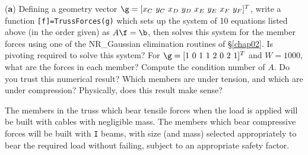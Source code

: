 \begin{exercise}
\noindent ({\bf a}) Defining a geometry vector
$\g=[x_C\ y_C\ x_D\ y_D\ x_E\ y_E\ x_F\ y_F]^T$,
write a function {\tt [f]=TrussForces(g)} which
sets up the system of 10 equations listed above (in the order given)
as $A\f = \b$, then solves this system for the member
forces using one of the NR_Gaussian elimination routines of \S \ref{chap02}.  Is pivoting required to solve this system?
For $\g=[1\ 0\ 1\ 1\ 2\ 0\ 2\ 1]^T$ and
$W=1000$, what are the forces in each member?  Compute the
condition number of $A$.  Do you trust this numerical result?  Which
members are under tension, and which are under compression?
Physically, does this result make sense?
\end{exercise}

The members in the truss which bear
tensile forces when the load is applied will be built with cables with
negligible mass.  The members which bear compressive forces will be built with {\tt I} beams, with size (and
mass) selected appropriately to bear the required load without failing,
subject to an appropriate safety factor. \vskip0.1in

\def\TE{TE}
\def\KE{KE}
\def\PE{PE}
\def\DE{DE}
\def\alphad{{\boldsymbol{\alpha}}}
\def\thetad{{\pmb{\theta}}}
\def\xid{{\boldsymbol{\xi}}}

